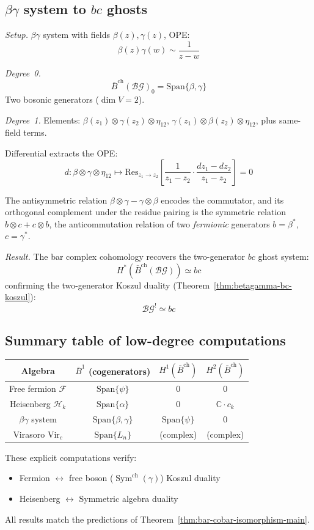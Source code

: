 \subsection{\texorpdfstring{$\beta\gamma$ system to $bc$ ghosts}{Beta-gamma system to bc ghosts}}

\noindent\emph{Setup.} $\beta\gamma$ system with fields $\beta(z), \gamma(z)$, OPE:
\[\beta(z)\gamma(w) \sim \frac{1}{z-w}\]

\emph{Degree~0.}
\[\bar{B}^{\text{ch}}(\mathcal{BG})_0 = \text{Span}\{\beta, \gamma\}\]
Two bosonic generators ($\dim V = 2$).

\emph{Degree~1.}
Elements: $\beta(z_1) \otimes \gamma(z_2) \otimes \eta_{12}$,
$\gamma(z_1) \otimes \beta(z_2) \otimes \eta_{12}$, plus same-field terms.

Differential extracts the OPE:
\[d: \beta \otimes \gamma \otimes \eta_{12} \mapsto
   \text{Res}_{z_1 \to z_2}\left[\frac{1}{z_1-z_2} \cdot \frac{dz_1-dz_2}{z_1-z_2}\right] = 0\]

The antisymmetric relation $\beta \otimes \gamma - \gamma \otimes \beta$ encodes the commutator, and
its orthogonal complement under the residue pairing is the symmetric relation $b \otimes c + c \otimes b$,
the anticommutation relation of two \emph{fermionic} generators $b = \beta^*$, $c = \gamma^*$.

\emph{Result.} The bar complex cohomology recovers the two-generator $bc$ ghost system:
\[H^*(\bar{B}^{\text{ch}}(\mathcal{BG})) \simeq bc\]
confirming the two-generator Koszul duality (Theorem~\ref{thm:betagamma-bc-koszul}):
\[\mathcal{BG}^! \simeq bc\]

\subsection{Summary table of low-degree computations}

\begin{center}
\begin{tabular}{c|c|c|c}
\textbf{Algebra} & $\bar{B}^1$ (cogenerators) & $H^1(\bar{B}^{\mathrm{ch}})$ & $H^2(\bar{B}^{\mathrm{ch}})$ \\ \hline
Free fermion $\mathcal{F}$ & $\text{Span}\{\psi\}$ & 0 & 0 \\
Heisenberg $\mathcal{H}_k$ & $\text{Span}\{\alpha\}$ & 0 & $\mathbb{C} \cdot c_k$ \\
$\beta\gamma$ system & $\text{Span}\{\beta,\gamma\}$ & $\text{Span}\{\psi\}$ & 0 \\
Virasoro $\text{Vir}_c$ & $\text{Span}\{L_n\}$ & (complex) & (complex)
\end{tabular}
\end{center}

These explicit computations verify:
\begin{itemize}
\item Fermion $\leftrightarrow$ free boson ($\operatorname{Sym}^{\mathrm{ch}}(\gamma)$) Koszul duality
\item Heisenberg $\leftrightarrow$ Symmetric algebra duality
\end{itemize}

All results match the predictions of Theorem~\ref{thm:bar-cobar-isomorphism-main}.
